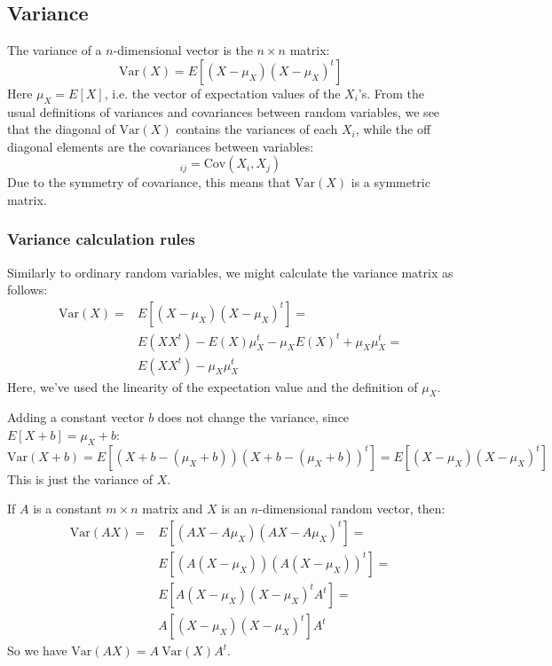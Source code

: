 \documentclass[12pt, a4paper]{article}
\numberwithin{equation}{section}
\begin{document}
\subsection{Variance}
The variance of a $n$-dimensional vector is the $n\times n$ matrix:
\begin{equation}
\textrm{Var}(X)=E[(X-\mu_X)(X-\mu_X)^t]
\end{equation}
Here $\mu_X=E[X]$, i.e. the vector of expectation values of the $X_i$'s. From the usual definitions of variances and covariances between random variables, we see that the diagonal of $\textrm{Var}(X)$ contains the variances of each $X_i$, while the off diagonal elements are the covariances between variables:
\begin{equation}
[\textrm{Var}(X)]_{ij}=\textrm{Cov}(X_i,X_j)
\end{equation}
Due to the symmetry of covariance, this means that $\textrm{Var}(X)$ is a symmetric matrix.

\subsubsection{Variance calculation rules}
Similarly to ordinary random variables, we might calculate the variance matrix as follows:
\begin{align}
\textrm{Var}(X)=&E[(X-\mu_X)(X-\mu_X)^t]=\\
&E(XX^t)-E(X)\mu_X^t-\mu_X E(X)^t+\mu_X\mu_X^t=\\
&E(XX^t)-\mu_X\mu_X^t
\end{align}
Here, we've used the linearity of the expectation value and the definition of $\mu_X$.

Adding a constant vector $b$ does not change the variance, since $E[X+b]=\mu_X+b$:
\begin{equation}
\textrm{Var}(X+b)=E[(X+b-(\mu_X+b))(X+b-(\mu_X+b))^t]=E[(X-\mu_X)(X-\mu_X)^t]
\end{equation}
This is just the variance of $X$.

If $A$ is a constant $m\times n$ matrix and $X$ is an $n$-dimensional random vector, then:
\begin{align}
\textrm{Var}(AX)=&E[(AX-A\mu_X)(AX-A\mu_X)^t]=\\
&E[(A(X-\mu_X))(A(X-\mu_X))^t]=\\
&E[A(X-\mu_X)(X-\mu_X)^t A^t]=\\
&A[(X-\mu_X)(X-\mu_X)^t]A^t
\end{align}
So we have $\textrm{Var}(AX)=A\ \textrm{Var}(X)A^t$.
\end{document}
